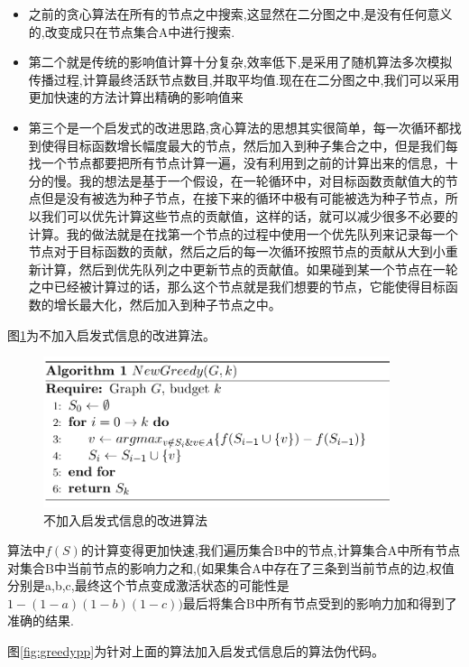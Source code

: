 \documentclass[11pt, a4paper]{article}
\begin{document}
  \begin{itemize}
  \item 之前的贪心算法在所有的节点之中搜索,这显然在二分图之中,是没有任何意义的,改变成只在节点集合A中进行搜索.
  \item 第二个就是传统的影响值计算十分复杂,效率低下,是采用了随机算法多次模拟传播过程,计算最终活跃节点数目,并取平均值.现在在二分图之中,我们可以采用更加快速的方法计算出精确的影响值来
  \item 第三个是一个启发式的改进思路,贪心算法的思想其实很简单，每一次循环都找到使得目标函数增长幅度最大的节点，然后加入到种子集合之中，但是我们每找一个节点都要把所有节点计算一遍，没有利用到之前的计算出来的信息，十分的慢。我的想法是基于一个假设，在一轮循环中，对目标函数贡献值大的节点但是没有被选为种子节点，在接下来的循环中极有可能被选为种子节点，所以我们可以优先计算这些节点的贡献值，这样的话，就可以减少很多不必要的计算。我的做法就是在找第一个节点的过程中使用一个优先队列来记录每一个节点对于目标函数的贡献，然后之后的每一次循环按照节点的贡献从大到小重新计算，然后到优先队列之中更新节点的贡献值。如果碰到某一个节点在一轮之中已经被计算过的话，那么这个节点就是我们想要的节点，它能使得目标函数的增长最大化，然后加入到种子节点之中。
  \end{itemize}

  图\ref{fig:new_greedy}为不加入启发式信息的改进算法。


  \begin{figure}[H]
    \centering\includegraphics[width=4in]{images/new_greedy.png}
    \caption{不加入启发式信息的改进算法}\label{fig:new_greedy}
  \end{figure}


  算法中$f(S)$的计算变得更加快速,我们遍历集合B中的节点,计算集合A中所有节点对集合B中当前节点的影响力之和,(如果集合A中存在了三条到当前节点的边,权值分别是a,b,c,最终这个节点变成激活状态的可能性是$1-(1-a) (1-b) (1-c))$最后将集合B中所有节点受到的影响力加和得到了准确的结果.

  图\ref{fig:greedypp}为针对上面的算法加入启发式信息后的算法伪代码。
\end{document}
